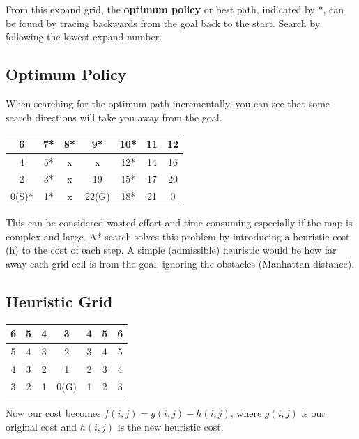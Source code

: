 \documentclass[twoside,11pt]{article}
\begin{document}
From this expand grid, the \textbf{optimum policy} or best path, indicated by *, can be found by tracing
backwards from the goal back to the start. Search by following the lowest expand number.


\subsection*{Optimum Policy}
When searching for the optimum path incrementally, you can see that some search directions will
take you away from the goal. 

\begin{table}[ht]
	\label{tab:map-4}
	\begin{center}
		\begin{tabular}{|c|c|c|c|c|c|c|}
			\hline
			6 & 7* & 8* & 9* & 10* & 11 & 12 \\
			\hline
			4 & 5* & x & x & 12* & 14 & 16 \\
			\hline
			2 & 3* & x & 19 & 15* & 17 & 20 \\
			\hline
			0(S)* & 1* & x & 22(G) & 18* & 21 & 0 \\
			\hline
		\end{tabular}
	\end{center}
\end{table}
This can be considered wasted effort and time consuming especially if the map is complex and large. 
A* search solves this problem by introducing a heuristic cost (h)
to the cost of each step. A simple (admissible) heuristic would be how far away each grid cell is
from the goal, ignoring the obstacles (Manhattan distance).

\subsection*{Heuristic Grid}
\begin{table}[ht]
	\label{tab:h-g}
	\begin{center}
		\begin{tabular}{|c|c|c|c|c|c|c|}
			\hline
			6 & 5 & 4 & 3 & 4 & 5 & 6 \\
			\hline
			5 & 4 & 3 & 2 & 3 & 4 & 5 \\
			\hline
			4 & 3 & 2 & 1 & 2 & 3 & 4 \\
			\hline
			3 & 2 & 1 & 0(G) & 1 & 2 & 3 \\
			\hline
		\end{tabular}
	\end{center}
\end{table}
Now our cost becomes $f(i, j) = g(i, j) + h(i, j)$, where $g(i, j)$ is our original cost and $h(i, j)$ is the new heuristic cost.
\end{document}

